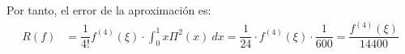 \begin{ejercicio}
\begin{enumerate}
        Por tanto, el error de la aproximación es:
        \begin{align*}
            R(f) &= \dfrac{1}{4!}f^{(4)}(\xi)\cdot \int_0^1 x\Pi^2(x)\ dx
            = \dfrac{1}{24}\cdot f^{(4)}(\xi)\cdot \dfrac{1}{600}
            = \dfrac{f^{(4)}(\xi)}{14400}
        \end{align*}

    \end{enumerate}
\end{ejercicio}